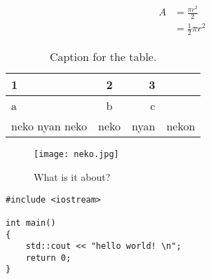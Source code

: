 \begin{equation}
\begin{split}
A & = \frac{\pi r^2}{2}\\
 & = \frac{1}{2} \pi r^2
 \end{split}
\end{equation}

\begin{table}[t!]%
  \centering
  \caption{Caption for the table.}
  \label{tab:table1}
  \begin{tabular}{l|c||r||c}
    1 & 2 & 3\\
    \hline
    a & b & c\\
    \hline
    neko nyan neko& neko & nyan & nekon\\
  \end{tabular}
\end{table}

\begin{figure}[t!]
\texttt{[image: neko.jpg]}
\caption{What is it about?}
\label{fig:whateverlabel}
\end{figure}

\begin{verbatim}
#include <iostream>
 
int main()
{
    std::cout << "hello world! \n";
    return 0;
}
\end{verbatim}

